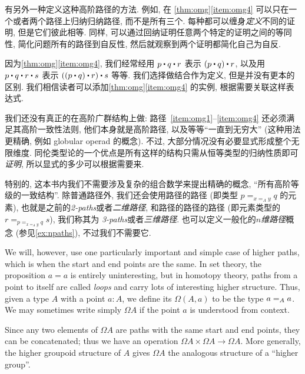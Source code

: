 \begin{rmk}
有另外一种定义这种高阶路径的方法.
例如, 在 \cref{thm:omg}\ref{item:omg4} 可以只在一个或者两个路径上归纳归纳路径, 而不是所有三个.
每种都可以缠身\emph{定义}不同的证明, 但是它们彼此相等.
同样, 可以通过回纳证明任意两个特定的证明之间的等同性, 简化问题所有的路径到自反性, 然后就观察到两个证明都简化自己为自反.
\end{rmk}

因为\cref{thm:omg}\ref{item:omg4}, 我们经常经用 $p\ct q\ct r$ 表示 $(p\ct q)\ct r$, 以及用 $p\ct q\ct r \ct s$ 表示 $((p\ct q)\ct r)\ct s$ 等等. 我们选择做结合作为定义, 但是并没有更本的区别. 我们相信读者可以添加\cref{thm:omg}\ref{item:omg4} 的实例, 根据需要关联这样表达式. 

我们还没有真正的在高阶广群结构上做: 路径~\ref{item:omg1}--\ref{item:omg4} 还必须满足其高阶一致性法则, 他们本身就是高阶路径, %
%
%
%
以及等等``一直到无穷大'' (这种用法更精确, 例如 globular operad 的概念). 不过, 大部分情况没有必要显式形成整个无限维度. 同伦类型论的一个优点是所有这样的结构只需从恒等类型的归纳性质即可\emph{证明}, 所以显式的多少可以根据需要来. 

特别的, 这本书内我们不需要涉及复杂的组合数学来提出精确的概念, ``所有高阶等级的一致结构''. 除普通路径外, 我们还会使用路径的路径 (即类型 $p =_{x=_A y} q$ 的元素), 也就是之前的\emph{2-paths}或者\emph{二维路径}, 和路径的路径的路径 (即元素类型的 $r = _{p =_{x=_A y} q} s$), 我们称其为 \emph{3-paths}或者\emph{三维路径}. 也可以定义一般化的\emph{$n$维路径}概念%
%
%
%
(参见\cref{ex:npaths}), 不过我们不需要它. 

We will, however, use one particularly important and simple case of higher paths, which is when the start and end points are the same. In set theory, the proposition $a=a$ is entirely uninteresting, but in homotopy theory, paths from a point to itself are called \emph{loops} and carry lots of interesting higher structure. Thus, given a type $A$ with a point $a:A$, we define its  %
$\Omega(A,a)$ to be the type $\id[A]{a}{a}$. We may sometimes write simply $\Omega A$ if the point $a$ is understood from context. 

Since any two elements of $\Omega A$ are paths with the same start and end points, they can be concatenated; thus we have an operation $\Omega A\times \Omega A\to \Omega A$. More generally, the higher groupoid structure of $A$ gives $\Omega A$ the analogous structure of a ``higher group''. 

